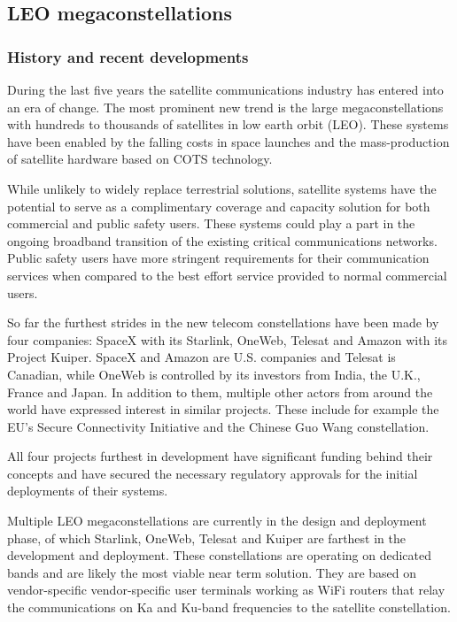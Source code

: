 \documentclass[english, 12pt, a4paper, elec, utf8, a-1b, online]{aaltothesis}
\begin{document}
\subsection{LEO megaconstellations}
\subsubsection{History and recent developments}
During the last five years the satellite communications industry has entered into an era of change. The most prominent new trend is the large megaconstellations with hundreds to thousands of satellites in low earth orbit (LEO). These systems have been enabled by the falling costs in space launches and the mass-production of satellite hardware based on COTS technology.

While unlikely to widely replace terrestrial solutions, satellite systems have the potential to serve as a complimentary coverage and capacity solution for both commercial and public safety users. These systems could play a part in the ongoing broadband transition of the existing critical communications networks. Public safety users have more stringent requirements for their communication services when compared to the best effort service provided to normal commercial users.

So far the furthest strides in the new telecom constellations have been made by four companies: SpaceX with its Starlink, OneWeb, Telesat and Amazon with its Project Kuiper. SpaceX and Amazon are U.S. companies and Telesat is Canadian, while OneWeb is controlled by its investors from India, the U.K., France and Japan. In addition to them, multiple other actors from around the world have expressed interest in similar projects. These include for example the EU’s Secure Connectivity Initiative and the Chinese Guo Wang constellation.

All four projects furthest in development have significant funding behind their concepts and have secured the necessary regulatory approvals for the initial deployments of their systems.

Multiple LEO megaconstellations are currently in the design and deployment phase, of which Starlink, OneWeb, Telesat and Kuiper are farthest in the development and deployment. These constellations are operating on dedicated bands and are likely the most viable near term solution. They are based on vendor-specific vendor-specific user terminals working as WiFi routers that relay the communications on Ka and Ku-band frequencies to the satellite constellation.
\end{document}

